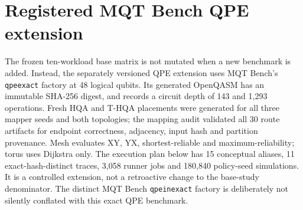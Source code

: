 \section{Registered MQT Bench QPE extension}

The frozen ten-workload base matrix is not mutated when a new benchmark is added.
Instead, the separately versioned QPE extension uses MQT Bench's \texttt{qpeexact}
factory at 48 logical qubits. Its generated OpenQASM has an immutable SHA-256
digest, and records a circuit depth of 143 and 1,293 operations. Fresh HQA and
T-HQA placements were generated for all three mapper seeds and both topologies;
the mapping audit validated all 30 route artifacts for endpoint correctness,
adjacency, input hash and partition provenance. Mesh evaluates XY, YX,
shortest-reliable and maximum-reliability; torus uses Dijkstra only. The execution
plan below has 15 conceptual aliases, 11 exact-hash-distinct traces, 3,058 runner
jobs and 180,840 policy-seed simulations. It is a controlled extension, not a
retroactive change to the base-study denominator. The distinct MQT Bench
\texttt{qpeinexact} factory is deliberately not silently conflated with this exact
QPE benchmark.


